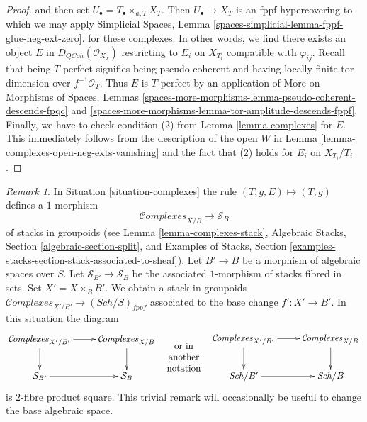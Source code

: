 \documentclass[10pt,a4paper]{amsart}
\theoremstyle{plain}
\theoremstyle{definition}
\theoremstyle{remark}
\newtheorem{remark}[subsection]{Remark}
\numberwithin{equation}{subsection}
\def\Sch{\mathit{Sch}}
\def\QCoh{\mathit{QCoh}}
\def\Complexesstack{\mathcal{C}\!\mathit{omplexes}}
\begin{document}
\begin{proof}
{and then set $U_\bullet = T_\bullet \times_{a, T} X_T$. Then
$U_\bullet \to X_T$ is an fppf hypercovering to which we may
apply Simplicial Spaces, Lemma
\ref{spaces-simplicial-lemma-fppf-glue-neg-ext-zero}.}
for these complexes. In other words, we find there exists an object
$E$ in $D_\QCoh(\mathcal{O}_{X_T})$ restricting to $E_i$ on $X_{T_i}$
compatible with $\varphi_{ij}$. Recall that being
$T$-perfect signifies being pseudo-coherent and having
locally finite tor dimension over $f^{-1}\mathcal{O}_T$.
Thus $E$ is $T$-perfect by an application of
More on Morphisms of Spaces, Lemmas
\ref{spaces-more-morphisms-lemma-pseudo-coherent-descends-fpqc} and
\ref{spaces-more-morphisms-lemma-tor-amplitude-descends-fppf}.
Finally, we have to check condition (2) from
Lemma \ref{lemma-complexes} for $E$.
This immediately follows from the description of the open $W$
in Lemma \ref{lemma-complexes-open-neg-exts-vanishing}
and the fact that (2) holds for $E_i$ on $X_{T_i}/T_i$.
\end{proof}

\begin{remark}
\label{remark-complexes-base-change}
In Situation \ref{situation-complexes} the rule
$(T, g, E) \mapsto (T, g)$ defines a $1$-morphism
$$
\Complexesstack_{X/B} \longrightarrow \mathcal{S}_B
$$
of stacks in groupoids
(see Lemma \ref{lemma-complexes-stack},
Algebraic Stacks, Section \ref{algebraic-section-split}, and
Examples of Stacks, Section
\ref{examples-stacks-section-stack-associated-to-sheaf}).
Let $B' \to B$ be a morphism of
algebraic spaces over $S$. Let $\mathcal{S}_{B'} \to \mathcal{S}_B$
be the associated $1$-morphism of stacks fibred in sets.
Set $X' = X \times_B B'$.
We obtain a stack in groupoids
$\Complexesstack_{X'/B'} \to (\Sch/S)_{fppf}$
associated to the base change $f' : X' \to B'$. In this situation
the diagram
$$
\vcenter{
\xymatrix{
\Complexesstack_{X'/B'} \ar[r] \ar[d] &
\Complexesstack_{X/B} \ar[d] \\
\mathcal{S}_{B'} \ar[r] & \mathcal{S}_B
}
}
\quad
\begin{matrix}
\text{or in} \\
\text{another} \\
\text{notation}
\end{matrix}
\quad
\vcenter{
\xymatrix{
\Complexesstack_{X'/B'} \ar[r] \ar[d] &
\Complexesstack_{X/B} \ar[d] \\
\Sch/B' \ar[r] & \Sch/B
}
}
$$
is $2$-fibre product square. This trivial remark
will occasionally be useful to change the base algebraic space.
\end{remark}
\end{document}
